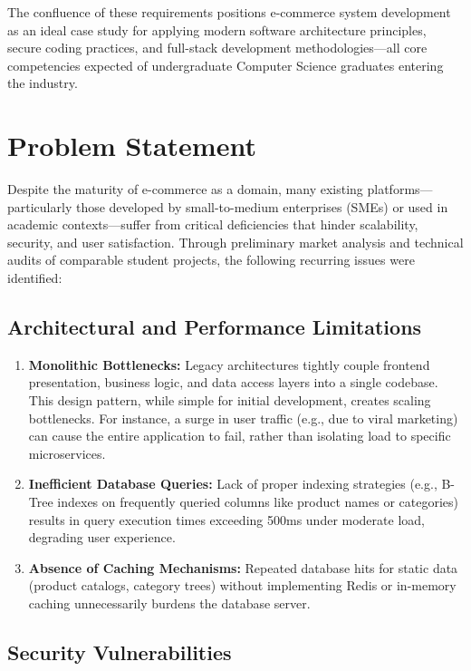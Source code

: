 The confluence of these requirements positions e-commerce system development as an ideal case study for applying modern software architecture principles, secure coding practices, and full-stack development methodologies—all core competencies expected of undergraduate Computer Science graduates entering the industry.

\section{Problem Statement}

Despite the maturity of e-commerce as a domain, many existing platforms—particularly those developed by small-to-medium enterprises (SMEs) or used in academic contexts—suffer from critical deficiencies that hinder scalability, security, and user satisfaction. Through preliminary market analysis and technical audits of comparable student projects, the following recurring issues were identified:

\subsection{Architectural and Performance Limitations}

\begin{enumerate}
    \item \textbf{Monolithic Bottlenecks:} Legacy architectures tightly couple frontend presentation, business logic, and data access layers into a single codebase. This design pattern, while simple for initial development, creates scaling bottlenecks. For instance, a surge in user traffic (e.g., due to viral marketing) can cause the entire application to fail, rather than isolating load to specific microservices.
    
    \item \textbf{Inefficient Database Queries:} Lack of proper indexing strategies (e.g., B-Tree indexes on frequently queried columns like product names or categories) results in query execution times exceeding 500ms under moderate load, degrading user experience. 
    
    \item \textbf{Absence of Caching Mechanisms:} Repeated database hits for static data (product catalogs, category trees) without implementing Redis or in-memory caching unnecessarily burdens the database server.
\end{enumerate}

\subsection{Security Vulnerabilities}

